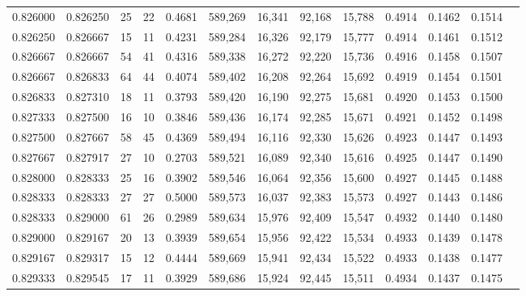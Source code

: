 \begin{tabular}{rrrrrrrrrrrrr}
0.826000 & 0.826250 &    25 &  22 &                                     0.4681 & 589,269 &  16,341 &  92,168 &  15,788 & 0.4914 & 0.1462 & 0.1514 \\
0.826250 & 0.826667 &    15 &  11 &                                     0.4231 & 589,284 &  16,326 &  92,179 &  15,777 & 0.4914 & 0.1461 & 0.1512 \\
0.826667 & 0.826667 &    54 &  41 &                                     0.4316 & 589,338 &  16,272 &  92,220 &  15,736 & 0.4916 & 0.1458 & 0.1507 \\
0.826667 & 0.826833 &    64 &  44 &                                     0.4074 & 589,402 &  16,208 &  92,264 &  15,692 & 0.4919 & 0.1454 & 0.1501 \\
0.826833 & 0.827310 &    18 &  11 &                                     0.3793 & 589,420 &  16,190 &  92,275 &  15,681 & 0.4920 & 0.1453 & 0.1500 \\
0.827333 & 0.827500 &    16 &  10 &                                     0.3846 & 589,436 &  16,174 &  92,285 &  15,671 & 0.4921 & 0.1452 & 0.1498 \\
0.827500 & 0.827667 &    58 &  45 &                                     0.4369 & 589,494 &  16,116 &  92,330 &  15,626 & 0.4923 & 0.1447 & 0.1493 \\
0.827667 & 0.827917 &    27 &  10 &                                     0.2703 & 589,521 &  16,089 &  92,340 &  15,616 & 0.4925 & 0.1447 & 0.1490 \\
0.828000 & 0.828333 &    25 &  16 &                                     0.3902 & 589,546 &  16,064 &  92,356 &  15,600 & 0.4927 & 0.1445 & 0.1488 \\
0.828333 & 0.828333 &    27 &  27 &                                     0.5000 & 589,573 &  16,037 &  92,383 &  15,573 & 0.4927 & 0.1443 & 0.1486 \\
0.828333 & 0.829000 &    61 &  26 &                                     0.2989 & 589,634 &  15,976 &  92,409 &  15,547 & 0.4932 & 0.1440 & 0.1480 \\
0.829000 & 0.829167 &    20 &  13 &                                     0.3939 & 589,654 &  15,956 &  92,422 &  15,534 & 0.4933 & 0.1439 & 0.1478 \\
0.829167 & 0.829317 &    15 &  12 &                                     0.4444 & 589,669 &  15,941 &  92,434 &  15,522 & 0.4933 & 0.1438 & 0.1477 \\
0.829333 & 0.829545 &    17 &  11 &                                     0.3929 & 589,686 &  15,924 &  92,445 &  15,511 & 0.4934 & 0.1437 & 0.1475 \\

\end{tabular}
